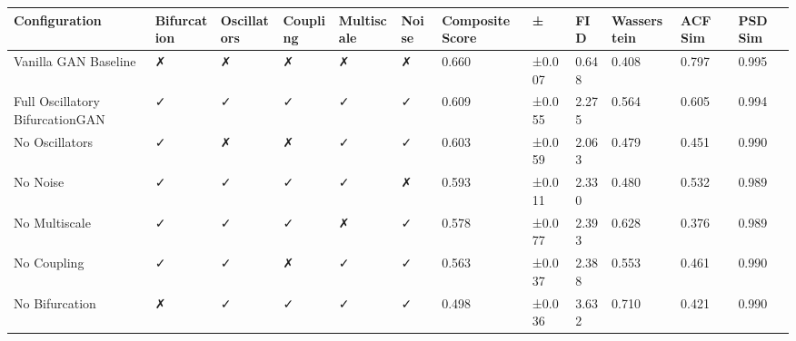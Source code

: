 \begin{tabular}{llllllllllll}
\toprule
Configuration & Bifurcation & Oscillators & Coupling & Multiscale & Noise & Composite Score & ± & FID & Wasserstein & ACF Sim & PSD Sim \\
\midrule
Vanilla GAN Baseline & ✗ & ✗ & ✗ & ✗ & ✗ & 0.660 & ±0.007 & 0.648 & 0.408 & 0.797 & 0.995 \\
Full Oscillatory BifurcationGAN & ✓ & ✓ & ✓ & ✓ & ✓ & 0.609 & ±0.055 & 2.275 & 0.564 & 0.605 & 0.994 \\
No Oscillators & ✓ & ✗ & ✗ & ✓ & ✓ & 0.603 & ±0.059 & 2.063 & 0.479 & 0.451 & 0.990 \\
No Noise & ✓ & ✓ & ✓ & ✓ & ✗ & 0.593 & ±0.011 & 2.330 & 0.480 & 0.532 & 0.989 \\
No Multiscale & ✓ & ✓ & ✓ & ✗ & ✓ & 0.578 & ±0.077 & 2.393 & 0.628 & 0.376 & 0.989 \\
No Coupling & ✓ & ✓ & ✗ & ✓ & ✓ & 0.563 & ±0.037 & 2.388 & 0.553 & 0.461 & 0.990 \\
No Bifurcation & ✗ & ✓ & ✓ & ✓ & ✓ & 0.498 & ±0.036 & 3.632 & 0.710 & 0.421 & 0.990 \\
\bottomrule
\end{tabular}
